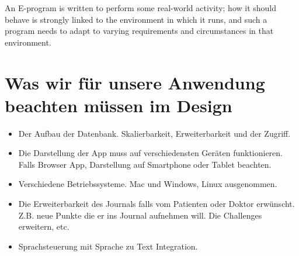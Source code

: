 An E-program is written to perform some real-world activity; how it should behave is strongly linked to the environment in which it runs, and such a program needs to adapt to varying requirements and circumstances in that environment.

\section{Was wir für unsere Anwendung beachten müssen im Design}

\begin{itemize}
    \item{Der Aufbau der Datenbank. Skalierbarkeit, Erweiterbarkeit und der Zugriff.}
    \item{Die Darstellung der App muss auf verschiedensten Geräten funktionieren. Falls Browser App, Darstellung auf Smartphone oder Tablet beachten.}
    \item{Verschiedene Betriebssysteme. Mac und Windows, Linux ausgenommen.}
    \item{Die Erweiterbarkeit des Journals falls vom Patienten oder Doktor erwünscht. Z.B. neue Punkte die er ins Journal aufnehmen will. Die Challenges erweitern, etc.}
    \item{Sprachsteuerung mit Sprache zu Text Integration.}
\end{itemize}
